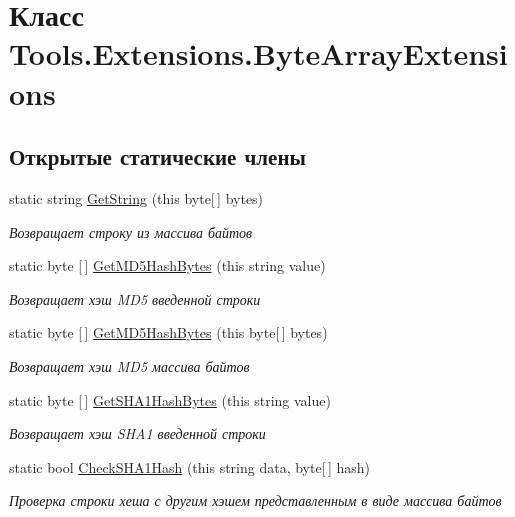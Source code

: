 \hypertarget{class_tools_1_1_extensions_1_1_byte_array_extensions}{}\section{Класс Tools.\+Extensions.\+Byte\+Array\+Extensions}
\label{class_tools_1_1_extensions_1_1_byte_array_extensions}
\subsection*{Открытые статические члены}
\begin{DoxyCompactItemize}
\item 
static string \hyperlink{class_tools_1_1_extensions_1_1_byte_array_extensions_aace63d2cf44bcde9f64682be685ae5c4}{Get\+String} (this byte\mbox{[}$\,$\mbox{]} bytes)
\begin{DoxyCompactList}\small\item\em Возвращает строку из массива байтов \end{DoxyCompactList}\item 
static byte \mbox{[}$\,$\mbox{]} \hyperlink{class_tools_1_1_extensions_1_1_byte_array_extensions_a3d3567f54f1611e1fd38e505d241b7bb}{Get\+M\+D5\+Hash\+Bytes} (this string value)
\begin{DoxyCompactList}\small\item\em Возвращает хэш M\+D5 введенной строки \end{DoxyCompactList}\item 
static byte \mbox{[}$\,$\mbox{]} \hyperlink{class_tools_1_1_extensions_1_1_byte_array_extensions_a66dea86fc117f5771099f2b70ff90200}{Get\+M\+D5\+Hash\+Bytes} (this byte\mbox{[}$\,$\mbox{]} bytes)
\begin{DoxyCompactList}\small\item\em Возвращает хэш M\+D5 массива байтов \end{DoxyCompactList}\item 
static byte \mbox{[}$\,$\mbox{]} \hyperlink{class_tools_1_1_extensions_1_1_byte_array_extensions_ab01eb7ee88f9579a00d41d4a535a728e}{Get\+S\+H\+A1\+Hash\+Bytes} (this string value)
\begin{DoxyCompactList}\small\item\em Возвращает хэш S\+H\+A1 введенной строки \end{DoxyCompactList}\item 
static bool \hyperlink{class_tools_1_1_extensions_1_1_byte_array_extensions_a193f65afd6d8e4e4d67de61cb638978c}{Check\+S\+H\+A1\+Hash} (this string data, byte\mbox{[}$\,$\mbox{]} hash)
\begin{DoxyCompactList}\small\item\em Проверка строки хеша с другим хэшем представленным в виде массива байтов \end{DoxyCompactList}\end{DoxyCompactItemize}


